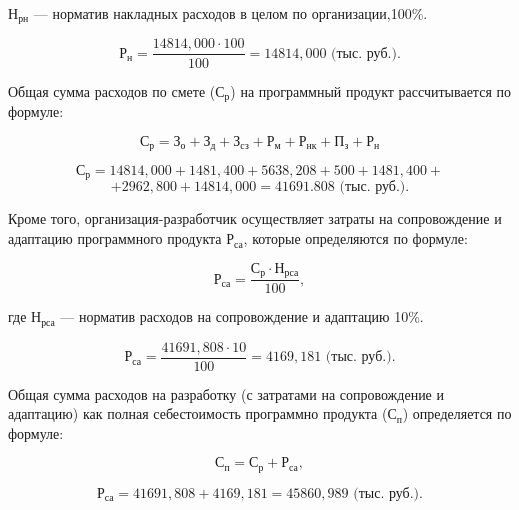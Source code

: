 \(\text{Н}_{\text{рн}}\) --- норматив накладных расходов в целом по организации,100\%.

\begin{displaymath}
  \text{Р}_{\text{н}} = \frac{14814,000 \cdot 100}{100} = 14814,000 \text{ (тыс. руб.)}.
\end{displaymath}

Общая сумма расходов по смете (\(\text{С}_{\text{р}}\)) на программный продукт рассчитывается по формуле:

\begin{displaymath}
  \text{С}_{\text{р}} = \text{З}_{\text{о}} + \text{З}_{\text{д}} + \text{З}_{\text{сз}} + \text{Р}_{\text{м}} + \text{Р}_{\text{нк}} + \text{П}_{\text{з}} + \text{Р}_{\text{н}}
\end{displaymath}

\begin{displaymath}
  \text{С}_{\text{р}} = 14814,000+1481,400+5638,208+500+1481,400+
\end{displaymath}
\begin{displaymath}
  +2962,800+14814,000=41691.808 \text{ (тыс. руб.)}.
\end{displaymath}


Кроме того, организация-разработчик осуществляет затраты на сопровождение и адаптацию программного продукта \(\text{Р}_{\text{са}}\), которые определяются по формуле:

\begin{displaymath}
  \text{Р}_{\text{са}} = \frac{\text{С}_{\text{р}} \cdot \text{Н}_{\text{рса}}}{100},
\end{displaymath}

где \(\text{Н}_{\text{рса}}\) --- норматив расходов на сопровождение и адаптацию 10\%.

\begin{displaymath}
  \text{Р}_{\text{са}} = \frac{41691,808 \cdot 10}{100} = 4169,181 \text{ (тыс. руб.)}.
\end{displaymath}

Общая сумма расходов на разработку (с затратами на сопровождение и адаптацию) как полная себестоимость программно продукта (\(\text{С}_{\text{п}}\)) определяется по формуле:

\begin{displaymath}
  \text{С}_{\text{п}} = \text{С}_{\text{р}} + \text{Р}_{\text{са}},
\end{displaymath}

\begin{displaymath}
  \text{Р}_{\text{са}} = 41691,808+4169,181 = 45860,989 \text{ (тыс. руб.)}.
\end{displaymath}

